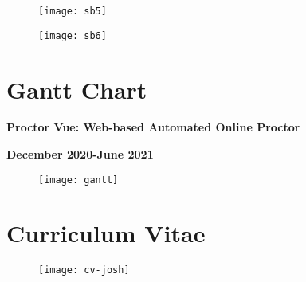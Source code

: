 \begin{figure}[!ht]
  \begin{center}
    \texttt{[image: sb5]}
  \end{center}
\end{figure}

\begin{figure}[!ht]
  \begin{center}
    \texttt{[image: sb6]}
  \end{center}
\end{figure}

\chapter{Gantt Chart}

\begin{center}
  \textbf{Proctor Vue: Web-based Automated Online Proctor}

  \textbf{December 2020-June 2021}
\end{center}

\begin{figure}[!ht]
  \begin{center}
    \texttt{[image: gantt]}
  \end{center}
\end{figure}

\chapter{Curriculum Vitae}

\begin{figure}[!ht]
  \begin{center}
    \texttt{[image: cv-josh]}
  \end{center}
\end{figure}






